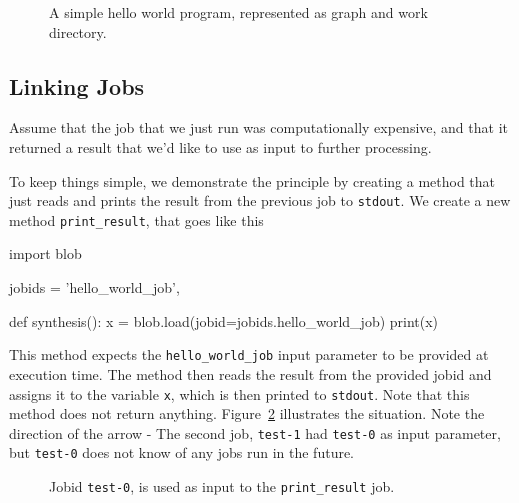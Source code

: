 \documentclass[a4paper]{article}
\begin{document}
\begin{figure}[h!]
  \begin{center}
    
    \caption{A simple hello world program, represented as graph and
      work directory.}
    \label{fig:execflow-hello-world}
  \end{center}
\end{figure}

\clearpage





\subsection{Linking Jobs}
Assume that the job that we just run was computationally expensive,
and that it returned a result that we'd like to use as input to further
processing.

To keep things simple, we demonstrate the principle by creating a
method that just reads and prints the result from the previous job to
\texttt{stdout}.  We create a new method \texttt{print\_result}, that
goes like this

\begin{python}
import blob
  
jobids = {'hello_world_job',}

def synthesis():
    x = blob.load(jobid=jobids.hello_world_job)
    print(x)
\end{python}

This method expects the \texttt{hello\_world\_job} input parameter to
be provided at execution time.  The method then reads the result from
the provided jobid and assigns it to the variable \texttt{x}, which is
then printed to \texttt{stdout}.  Note that this method does not
return anything.  Figure~\ref{fig:execflow-print-result} illustrates
the situation.  Note the direction of the arrow - The second job,
\texttt{test-1} had \texttt{test-0} as input parameter, but
\texttt{test-0} does not know of any jobs run in the future.

\begin{figure}[h!]
  \begin{center}
    
    \caption{Jobid \texttt{test-0}, is used as input to the
      \texttt{print\_result} job.}
    \label{fig:execflow-print-result}
  \end{center}
\end{figure}

\clearpage
\end{document}
